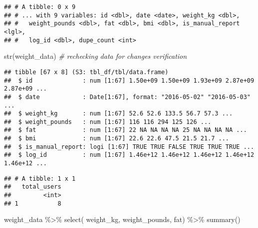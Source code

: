 \documentclass[
]{article}
\newenvironment{Shaded}{\begin{snugshade}}{\end{snugshade}}
\newcommand{\AttributeTok}[1]{\textcolor[rgb]{0.77,0.63,0.00}{#1}}
\newcommand{\CommentTok}[1]{\textcolor[rgb]{0.56,0.35,0.01}{\textit{#1}}}
\newcommand{\FunctionTok}[1]{\textcolor[rgb]{0.00,0.00,0.00}{#1}}
\newcommand{\NormalTok}[1]{#1}
\newcommand{\SpecialCharTok}[1]{\textcolor[rgb]{0.00,0.00,0.00}{#1}}
\begin{document}
\begin{verbatim}
## # A tibble: 0 x 9
## # ... with 9 variables: id <dbl>, date <date>, weight_kg <dbl>,
## #   weight_pounds <dbl>, fat <dbl>, bmi <dbl>, is_manual_report <lgl>,
## #   log_id <dbl>, dupe_count <int>
\end{verbatim}

\begin{Shaded}
\begin{Highlighting}[]
 \FunctionTok{str}\NormalTok{(weight\_data) }\CommentTok{\# rechecking data for changes verification}
\end{Highlighting}
\end{Shaded}

\begin{verbatim}
## tibble [67 x 8] (S3: tbl_df/tbl/data.frame)
##  $ id              : num [1:67] 1.50e+09 1.50e+09 1.93e+09 2.87e+09 2.87e+09 ...
##  $ date            : Date[1:67], format: "2016-05-02" "2016-05-03" ...
##  $ weight_kg       : num [1:67] 52.6 52.6 133.5 56.7 57.3 ...
##  $ weight_pounds   : num [1:67] 116 116 294 125 126 ...
##  $ fat             : num [1:67] 22 NA NA NA NA 25 NA NA NA NA ...
##  $ bmi             : num [1:67] 22.6 22.6 47.5 21.5 21.7 ...
##  $ is_manual_report: logi [1:67] TRUE TRUE FALSE TRUE TRUE TRUE ...
##  $ log_id          : num [1:67] 1.46e+12 1.46e+12 1.46e+12 1.46e+12 1.46e+12 ...
\end{verbatim}

\begin{Shaded}
\end{Shaded}

\begin{verbatim}
## # A tibble: 1 x 1
##   total_users
##         <int>
## 1           8
\end{verbatim}

\begin{Shaded}
\begin{Highlighting}[]
\NormalTok{weight\_data }\SpecialCharTok{\%\textgreater{}\%}
\FunctionTok{select}\NormalTok{(}
\NormalTok{weight\_kg,}
\NormalTok{weight\_pounds,}
\NormalTok{fat) }\SpecialCharTok{\%\textgreater{}\%}
\FunctionTok{summary}\NormalTok{()}
\end{Highlighting}
\end{Shaded}
\end{document}
